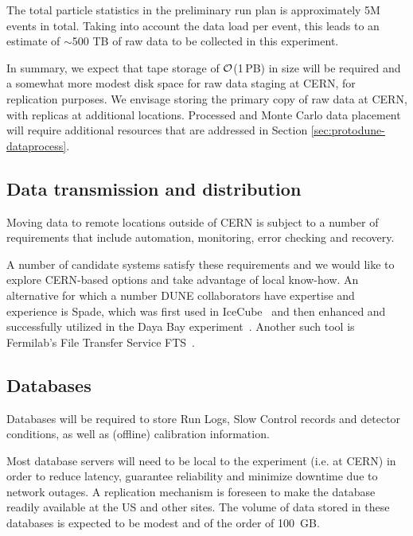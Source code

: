 
The total particle statistics in the preliminary run plan
 is approximately 5M events in total.  Taking into account the data load per event,
this leads to an estimate of $\sim$500 TB of raw data to be collected in this experiment. 

In summary, we expect that tape storage of $\cal{O}$(1\,PB) in 
size will be required and a somewhat more modest disk space for raw data staging at 
CERN, for replication purposes.  We envisage storing the primary copy of raw data at CERN, with replicas at additional locations. 
%
Processed and Monte Carlo data placement will require additional resources that are addressed in Section \ref{sec:protodune-dataprocess}.


\subsection{Data transmission and distribution}
Moving data to remote locations outside of CERN is subject to a number of requirements that include
automation, monitoring, error checking and recovery. 

A number of candidate systems satisfy these requirements and we would like to explore CERN-based options and take advantage of 
local know-how. An alternative for which a number DUNE collaborators have expertise and 
experience is Spade, which was first used in IceCube~\cite{spade_icecube} and then 
enhanced and successfully utilized in the Daya Bay experiment~\cite{spade_dayabay}.  Another such tool is Fermilab's File Transfer Service FTS~\cite{fts}.


\subsection{Databases}
Databases will be required to store Run Logs, Slow Control records and detector conditions, as well as (offline) calibration information.

Most database servers will need to be local to the experiment (i.e. at CERN) in order to reduce latency, guarantee reliability and minimize
downtime due to network outages. A replication mechanism is foreseen to make the database readily available at the US and other sites.
The volume of data stored in these databases is expected to be modest and of the order of 100~GB.


